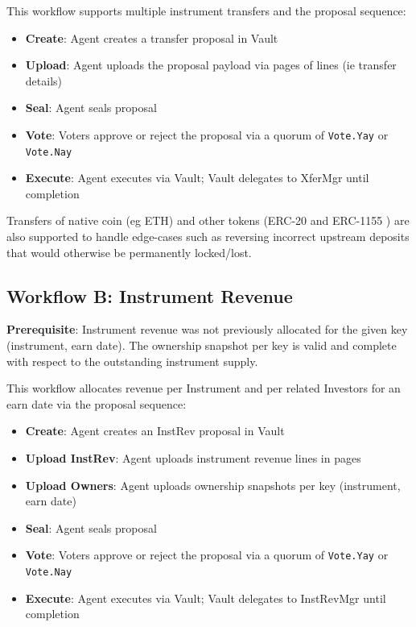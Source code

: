 \documentclass[10pt]{article}
\begin{document}
This workflow supports multiple instrument transfers and the proposal sequence:

\begin{itemize}
    \item \textbf{Create}: Agent creates a transfer proposal in Vault
    \item \textbf{Upload}: Agent uploads the proposal payload via pages of lines (ie transfer details)
    \item \textbf{Seal}: Agent seals proposal
    \item \textbf{Vote}: Voters approve or reject the proposal via a quorum of \texttt{Vote.Yay} or \texttt{Vote.Nay}
    \item \textbf{Execute}: Agent executes via Vault; Vault delegates to XferMgr until completion
\end{itemize}

\begin{GsNoteLow}
    Transfers of native coin (eg ETH) and other tokens (ERC-20 and ERC-1155 \cite{ethereum_erc1155}) are also supported to handle edge-cases such as reversing incorrect upstream deposits that would otherwise be permanently locked/lost.
\end{GsNoteLow}

\subsection{Workflow B: Instrument Revenue}
\textbf{Prerequisite}: Instrument revenue was not previously allocated for the given key (instrument, earn date). The ownership snapshot per key is valid and complete with respect to the outstanding instrument supply.

This workflow allocates revenue per Instrument and per related Investors for an earn date via the proposal sequence:

\begin{itemize}
    \item \textbf{Create}: Agent creates an InstRev proposal in Vault
    \item \textbf{Upload InstRev}: Agent uploads instrument revenue lines in pages
    \item \textbf{Upload Owners}: Agent uploads ownership snapshots per key (instrument, earn date)
    \item \textbf{Seal}: Agent seals proposal
    \item \textbf{Vote}: Voters approve or reject the proposal via a quorum of \texttt{Vote.Yay} or \texttt{Vote.Nay}
    \item \textbf{Execute}: Agent executes via Vault; Vault delegates to InstRevMgr until completion
\end{itemize}
\end{document}
